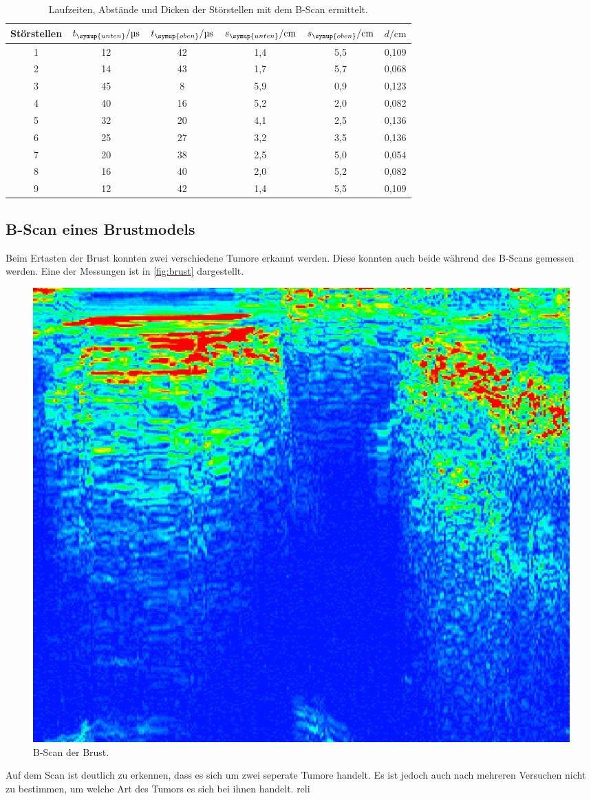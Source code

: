 \begin{table}[H]
  \centering
  \begin{tabular}{c c c c c c}
    \toprule
    Störstellen & $t_{\symup{unten}}/\unit{\micro\second}$ & $t_{\symup{oben}}/\unit{\micro\second}$ & $s_{\symup{unten}}/\unit{\centi\meter}$ & $s_{\symup{oben}}/\unit{\centi\meter}$ & $d/\unit{\centi\meter}$ \\
    \midrule
     1 & 12 & 42 & 1,4 & 5,5 & 0,109 \\
     2 & 14 & 43 & 1,7 & 5,7 & 0,068 \\
     3 & 45 &  8 & 5,9 & 0,9 & 0,123 \\
     4 & 40 & 16 & 5,2 & 2,0 & 0,082 \\
     5 & 32 & 20 & 4,1 & 2,5 & 0,136 \\
     6 & 25 & 27 & 3,2 & 3,5 & 0,136 \\
     7 & 20 & 38 & 2,5 & 5,0 & 0,054 \\
     8 & 16 & 40 & 2,0 & 5,2 & 0,082 \\
     9 & 12 & 42 & 1,4 & 5,5 & 0,109 \\
    \bottomrule
  \end{tabular}
  \caption{Laufzeiten, Abstände und Dicken der Störstellen mit dem B-Scan ermittelt.}
  \label{tab:BScanDicke}
\end{table}


\subsection{B-Scan eines Brustmodels}

Beim Ertasten der Brust konnten zwei verschiedene Tumore erkannt werden. Diese konnten auch beide während des B-Scans gemessen werden. Eine der Messungen ist in
\autoref{fig:brust} dargestellt.
\begin{figure}[H]
  \centering
  \includegraphics[width=\textwidth]{data/brust2.jpeg}
  \caption{B-Scan der Brust.}
  \label{fig:brust}
\end{figure}
Auf dem Scan ist deutlich zu erkennen, dass es sich um zwei seperate Tumore handelt. Es ist jedoch auch nach mehreren Versuchen nicht zu bestimmen, um welche Art des Tumors es
sich bei ihnen handelt. reli